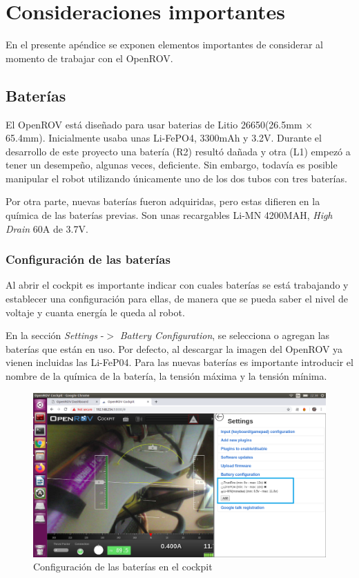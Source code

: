 \chapter{Consideraciones importantes}
\label{apendiceA}

En el presente apéndice se exponen elementos importantes de considerar al momento de trabajar con el OpenROV. 

\section{Baterías}
\par El OpenROV está diseñado para usar baterias de Litio 26650(26.5mm × 65.4mm). Inicialmente usaba unas Li-FePO4, 3300mAh y 3.2V. Durante el desarrollo de este proyecto una batería (R2) resultó dañada y otra (L1) empezó a tener un desempeño, algunas veces, deficiente. Sin embargo, todavía es posible manipular el robot utilizando únicamente uno de los dos tubos con tres baterías. 

\par Por otra parte, nuevas baterías fueron adquiridas, pero estas difieren en la química de las baterías previas. Son unas recargables Li-MN 4200MAH, \textit{High Drain} 60A de 3.7V.

\subsection{Configuración de las baterías}
\par Al abrir el cockpit es importante indicar con cuales baterías se está trabajando y establecer una configuración para ellas, de manera que se pueda saber el nivel de voltaje y cuanta energía le queda al robot.

En la sección \textit{Settings} -$>$ \textit{Battery Configuration}, se selecciona o agregan las baterías que están en uso. Por defecto, al descargar la imagen del OpenROV ya vienen incluidas las Li-FeP04. Para las nuevas baterías es importante introducir el nombre de la química de la batería, la  tensión máxima y la tensión mínima.

    \begin{figure}[H]
        \centering
        \includegraphics[scale=0.4]{partes/ImgSophia/Apendice/Baterias.png}
        \caption{Configuración de las baterías en el cockpit}
        \label{fig:BattCockpit}
    \end{figure}

